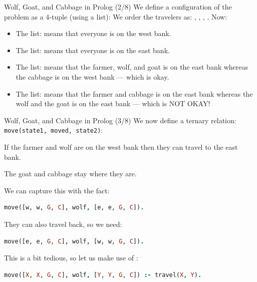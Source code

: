 \begin{frame}[fragile]{Wolf, Goat, and Cabbage in Prolog (2/8)}
We define a configuration of the problem as a 4-tuple (using a list):
%
We order the travelers as: , , ,
. Now:
%
\begin{itemize}
    \item The list: \Code{[w, w, w, w]} means that everyone is on the west bank.
    \item The list: \Code{[e, e, e, e]} means that everyone is on the east bank.
    \item The list: \Code{[e, e, e, w]} means that the farmer, wolf, and goat is
    on the east bank whereas the cabbage is on the west bank --- which is okay.
    \item The list: \Code{[e, w, w, e]} means that the farmer and cabbage is on
    the east bank whereas the wolf and the goat is on the east bank --- which is
    NOT OKAY!
\end{itemize}
\end{frame}
    
\begin{frame}[fragile]{Wolf, Goat, and Cabbage in Prolog (3/8)}
We now define a ternary relation: \texttt{move(state1, moved, state2)}:

If the farmer and wolf are on the west bank then they can travel to the east bank. 

The goat and cabbage stay where they are. 

We can capture this with the fact:

\begin{lstlisting}[language=prolog, xleftmargin=0.5cm]
move([w, w, G, C], wolf, [e, e, G, C]).
\end{lstlisting}

\pause

They can also travel back, so we need:

\begin{lstlisting}[language=prolog, xleftmargin=0.5cm]
move([e, e, G, C], wolf, [w, w, G, C]).
\end{lstlisting}

\pause

This is a bit tedious, so let us make use of :

\begin{lstlisting}[language=prolog, xleftmargin=0.5cm]
move([X, X, G, C], wolf, [Y, Y, G, C]) :- travel(X, Y).
\end{lstlisting}
\end{frame}

